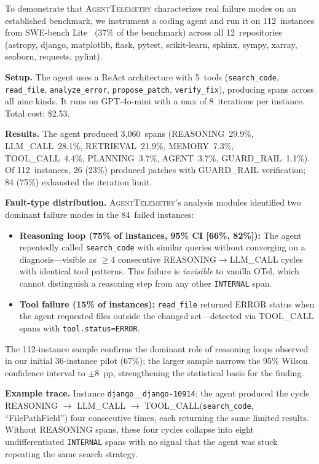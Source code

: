 \documentclass[sigplan,10pt,screen]{acmart}
\begin{document}
To demonstrate that \textsc{AgentTelemetry} characterizes real failure
modes on an established benchmark, we instrument a coding agent and run
it on 112~instances from SWE-bench Lite~\cite{swebench} (37\% of the benchmark) across all
12~repositories (astropy, django, matplotlib, flask, pytest, scikit-learn,
sphinx, sympy, xarray, seaborn, requests, pylint).

\textbf{Setup.}  The agent uses a ReAct architecture with 5~tools
(\texttt{search\_code}, \texttt{read\_file}, \texttt{analyze\_error},
\texttt{propose\_patch}, \texttt{verify\_fix}), producing spans across
all nine kinds.  It runs on GPT-4o-mini with a max of 8~iterations per
instance.  Total cost: \$2.53.

\textbf{Results.}
The agent produced 3{,}060~spans (REASONING~29.9\%, LLM\_CALL~28.1\%,
RETRIEVAL~21.9\%, MEMORY~7.3\%, TOOL\_CALL~4.4\%, PLANNING~3.7\%,
AGENT~3.7\%, GUARD\_RAIL~1.1\%).  Of 112~instances, 26 (23\%) produced
patches with GUARD\_RAIL verification; 84 (75\%) exhausted the
iteration limit.

\textbf{Fault-type distribution.}
\textsc{AgentTelemetry}'s analysis modules identified two dominant
failure modes in the 84~failed instances:

\begin{itemize}[nosep]
\item \textbf{Reasoning loop (75\% of instances, 95\% CI [66\%, 82\%]):} The agent repeatedly
  called \texttt{search\_code} with similar queries without converging on a
  diagnosis---visible as $\geq$4 consecutive REASONING$\to$LLM\_CALL
  cycles with identical tool patterns.  This failure is \emph{invisible}
  to vanilla OTel, which cannot distinguish a reasoning step from any
  other \texttt{INTERNAL} span.
\item \textbf{Tool failure (15\% of instances):} \texttt{read\_file}
  returned ERROR status when the agent requested files outside the
  changed set---detected via TOOL\_CALL spans with
  \texttt{tool.status=ERROR}.
\end{itemize}

\noindent
The 112-instance sample confirms the dominant role of reasoning loops
observed in our initial 36-instance pilot (67\%); the larger sample
narrows the 95\% Wilson confidence interval to $\pm$8~pp, strengthening
the statistical basis for the finding.

\textbf{Example trace.} Instance \texttt{django\_\_django-10914}: the agent produced the cycle REASONING $\to$ LLM\_CALL $\to$ TOOL\_CALL(\texttt{search\_code}, ``FilePathField'') four consecutive times, each returning the same limited results.  Without REASONING spans, these four cycles collapse into eight undifferentiated \texttt{INTERNAL} spans with no signal that the agent was stuck repeating the same search strategy.
\end{document}
